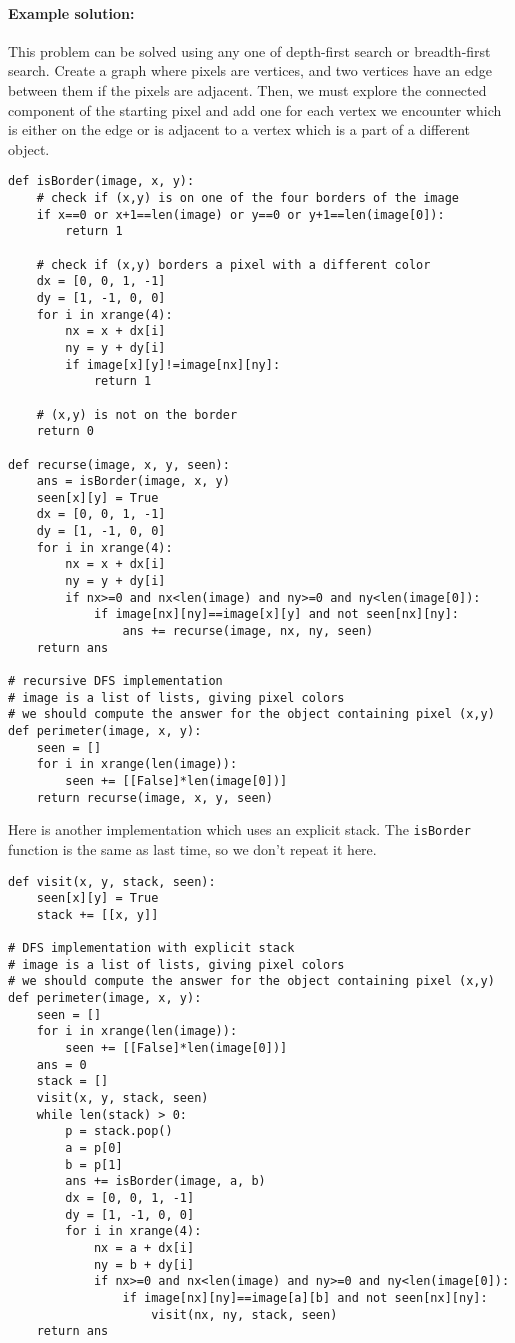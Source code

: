 \documentclass[11pt]{article}
\begin{document}
\paragraph{Example solution:}
This problem can be solved using any one of depth-first search or
breadth-first search.  Create a graph where pixels are vertices, and
two vertices have an edge between them if the pixels are adjacent.
Then, we must explore the connected component of the starting pixel
and add one for each vertex we encounter which is either on the edge
or is adjacent to a vertex which is a part of a different object.

\begin{verbatim}
def isBorder(image, x, y):
    # check if (x,y) is on one of the four borders of the image
    if x==0 or x+1==len(image) or y==0 or y+1==len(image[0]):
        return 1

    # check if (x,y) borders a pixel with a different color
    dx = [0, 0, 1, -1]
    dy = [1, -1, 0, 0]
    for i in xrange(4):
        nx = x + dx[i]
        ny = y + dy[i]
        if image[x][y]!=image[nx][ny]:
            return 1
    
    # (x,y) is not on the border
    return 0

def recurse(image, x, y, seen):
    ans = isBorder(image, x, y)
    seen[x][y] = True
    dx = [0, 0, 1, -1]
    dy = [1, -1, 0, 0]
    for i in xrange(4):
        nx = x + dx[i]
        ny = y + dy[i]
        if nx>=0 and nx<len(image) and ny>=0 and ny<len(image[0]):
            if image[nx][ny]==image[x][y] and not seen[nx][ny]:
                ans += recurse(image, nx, ny, seen)
    return ans

# recursive DFS implementation
# image is a list of lists, giving pixel colors
# we should compute the answer for the object containing pixel (x,y)
def perimeter(image, x, y):
    seen = []
    for i in xrange(len(image)):
        seen += [[False]*len(image[0])]
    return recurse(image, x, y, seen)
\end{verbatim}

Here is another implementation which uses an explicit stack.  The
\texttt{isBorder} function is the same as last time, so we don't
repeat it here.

\begin{verbatim}
def visit(x, y, stack, seen):
    seen[x][y] = True
    stack += [[x, y]]

# DFS implementation with explicit stack
# image is a list of lists, giving pixel colors
# we should compute the answer for the object containing pixel (x,y)
def perimeter(image, x, y):
    seen = []
    for i in xrange(len(image)):
        seen += [[False]*len(image[0])]
    ans = 0
    stack = []
    visit(x, y, stack, seen)
    while len(stack) > 0:    
        p = stack.pop()
        a = p[0]
        b = p[1]       
        ans += isBorder(image, a, b)
        dx = [0, 0, 1, -1]
        dy = [1, -1, 0, 0]
        for i in xrange(4):
            nx = a + dx[i]
            ny = b + dy[i]
            if nx>=0 and nx<len(image) and ny>=0 and ny<len(image[0]):
                if image[nx][ny]==image[a][b] and not seen[nx][ny]:
                    visit(nx, ny, stack, seen)
    return ans
\end{verbatim}
\end{document}
